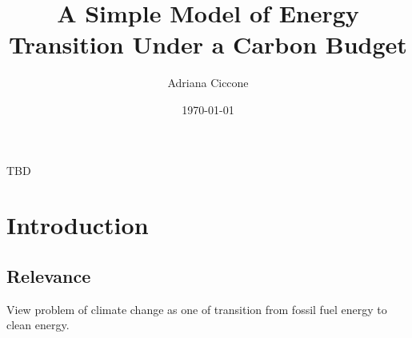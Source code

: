 \documentclass[singlespace]{easychithesis}
\begin{document}
\title{A Simple Model of Energy Transition Under a Carbon Budget} 
\author{Adriana Ciccone}
\date{\today}
\maketitle




TBD




%
%

\tableofcontents

%
% 


%
%
\mainmatter

%
%
\chapter{Introduction}
\section{Relevance}

View problem of climate change as one of transition from fossil fuel energy to clean energy.
\end{document}
